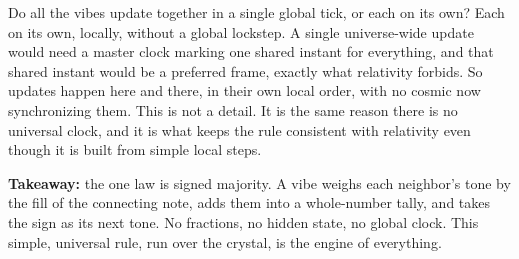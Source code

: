 Do all the vibes update together in a single global tick, or each on its own? Each on its own, locally, without a global lockstep. A single universe-wide update would need a master clock marking one shared instant for everything, and that shared instant would be a preferred frame, exactly what relativity forbids. So updates happen here and there, in their own local order, with no cosmic now synchronizing them. This is not a detail. It is the same reason there is no universal clock, and it is what keeps the rule consistent with relativity even though it is built from simple local steps.

\textbf{Takeaway:} the one law is signed majority. A vibe weighs each neighbor's tone by the fill of the connecting note, adds them into a whole-number tally, and takes the sign as its next tone. No fractions, no hidden state, no global clock. This simple, universal rule, run over the crystal, is the engine of everything.
